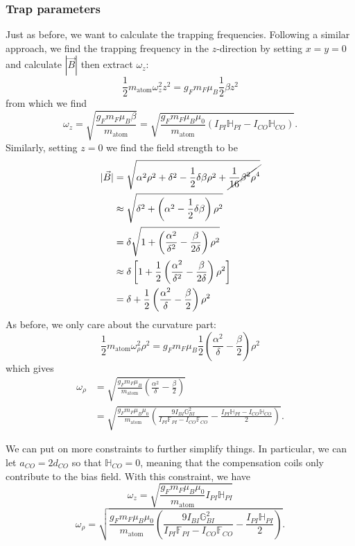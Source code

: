 \documentclass{book}
\theoremstyle{definition}
\newcommand{\al}{\alpha}
\newcommand{\be}{\beta}
\newcommand{\f}[2]{\frac{#1}{#2}}
\newcommand{\lp}{\left(}
\newcommand{\rp}{\right)}
\newcommand{\lb}{\left[}
\newcommand{\rb}{\right]}
\begin{document}
\subsubsection*{Trap parameters}

Just as before, we want to calculate the trapping frequencies. Following a similar approach, we find the trapping frequency in the $z$-direction by setting $x=y=0$ and calculate $|\vec{B}|$ then extract $\omega_z$:
\begin{equation*}
\f{1}{2}m_\text{atom} \omega_z^2 z^2 = g_F m_F \mu_B\f{1}{2}\beta z^2
\end{equation*}
from which we find 
\begin{equation*}
\omega_z = \sqrt{\f{ g_F m_F \mu_B \beta}{m_\text{atom}}} = \sqrt{\f{g_F m_F \mu_B\mu_0 }{m_\text{atom}}\lp I_{PI}\mathbb{H}_{PI} - I_{CO}\mathbb{H}_{CO} \rp }.
\end{equation*}
Similarly, setting $z=0$ we find the field strength to be 
\begin{align*}
|\vec{B}| &= \sqrt{\al^2 \rho^2 + \delta^2 - \f{1}{2}\delta \beta \rho^2 + \cancel{\f{1}{16}\be^2 \rho^4}}\\
&\approx \sqrt{\delta^2 + \lp  \al^2 - \f{1}{2}\delta \beta\rp\rho^2} \\
&= \delta \sqrt{1 + \lp \f{\al^2}{\delta^2} - \f{\beta}{2\delta} \rp\rho^2 }\\
&\approx \delta \lb 1 + \f{1}{2}\lp \f{\al^2}{\delta^2} - \f{\be}{2\delta} \rp \rho^2 \rb\\
&= \delta + \f{1}{2}\lp \f{\al^2}{\delta} - \f{\beta}{2} \rp \rho^2
\end{align*}
As before, we only care about the curvature part:
\begin{equation*}
\f{1}{2}m_\text{atom} \omega_\rho^2 \rho^2 = g_F m_F \mu_B \f{1}{2}\lp \f{\al^2}{\delta} - \f{\beta}{2} \rp\rho^2
\end{equation*}
which gives
\begin{align*}
\omega_\rho &= \sqrt{\f{g_F m_F \mu_B}{m_\text{atom}} \lp \f{\al^2}{\delta} - \f{\be}{2} \rp  } \\
&= \sqrt{\f{g_F m_F \mu_B \mu_0}{m_\text{atom}} \lp \f{9I_{BI}\mathbb{G}_{BI}^2}{ I_{PI} \mathbb{F}_{PI} -  I_{CO} \mathbb{F}_{CO} }  - \f{ I_{PI}\mathbb{H}_{PI} - I_{CO}\mathbb{H}_{CO}}{2} \rp }.
\end{align*}



We can put on more constraints to further simplify things. In particular, we can let $a_{CO} = 2d_{CO}$ so that $\mathbb{H}_{CO} = 0$, meaning that the compensation coils only contribute to the bias field. With this constraint, we have
\begin{equation*}
\omega_z = \sqrt{\f{g_F m_F \mu_B\mu_0 }{m_\text{atom}} I_{PI}\mathbb{H}_{PI}  }
\end{equation*}
\begin{equation*}
\omega_\rho = \sqrt{\f{g_F m_F \mu_B \mu_0}{m_\text{atom}} \lp \f{9I_{BI}\mathbb{G}_{BI}^2}{ I_{PI} \mathbb{F}_{PI} -  I_{CO} \mathbb{F}_{CO} }  - \f{ I_{PI}\mathbb{H}_{PI} }{2} \rp }.
\end{equation*}
\end{document}
